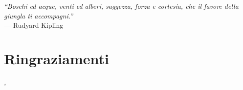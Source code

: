 
\cleardoublepage
{}
{}

\begin{flushright}{ %
	\slshape
	``Boschi ed acque, venti ed alberi, saggezza, forza e cortesia, che il favore della giungla ti accompagni.''} \\
	\medskip
    --- Rudyard Kipling
\end{flushright}


\bigskip

\begingroup
\let\clearpage\relax
\let\cleardoublepage\relax
\let\cleardoublepage\relax

\chapter*{Ringraziamenti}



\bigskip

\noindent\textit{\myLocation, \myTime}
\hfill \myName

\endgroup
